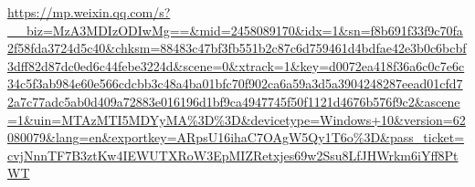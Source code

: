 \documentclass[onecolumn,journal]{IEEEtran}
\begin{document}
\vspace{2ex}








\url{https://mp.weixin.qq.com/s?__biz=MzA3MDIzODIwMg==&mid=2458089170&idx=1&sn=f8b691f33f9c70fa2f58fda3724d5c40&chksm=88483c47bf3fb551b2c87c6d759461d4bdfae42e3b0c6bcbf3dff82d87dc0ed6c44febe3224d&scene=0&xtrack=1&key=d0072ea418f36a6c0c7e6c34c5f3ab984e60e566cdcbb3c48a4ba01bfc70f902ca6a59a3d5a3904248287eead01cfd72a7c77adc5ab0d409a72883e016196d1bf9ca4947745f50f1121d4676b576f9c2&ascene=1&uin=MTAzMTI5MDYyMA%3D%3D&devicetype=Windows+10&version=62080079&lang=en&exportkey=ARpsU16ihaC7OAgW5Qy1T6o%3D&pass_ticket=cvjNnnTF7B3ztKw4IEWUTXRoW3EpMIZRetxjes69w2Ssu8LfJHWrkm6iYff8PtWT}
\end{document}
